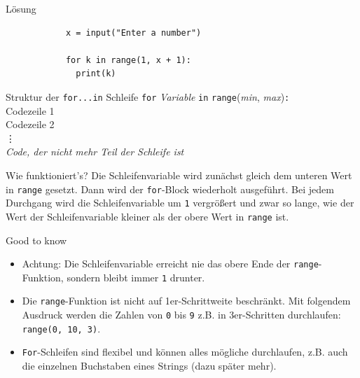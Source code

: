 \documentclass[algorithm,pgfplots,colortheme=dark]{cuzbeamer}
\newcommand{\py}[1]{\texttt{#1}}
\newcommand{\pybw}[1]{\texttt{#1}}
\newcommand{\spacechar}{\texttt{\char32\hspace{2pt}}}
\begin{document}
\begin{fragile}{}
	\begin{block}{Lösung}
		\begin{verbatim}
			x = input("Enter a number")
			
			for k in range(1, x + 1):	
			  print(k)
		\end{verbatim}
	\end{block}
\end{fragile}

\begin{frame}

	\renewcommand{\baselinestretch}{1.5}
	\begin{block}{Struktur der \texttt{for...in} Schleife}
		\vspace{2pt}
		\pause \py{for} \pause \textit{Variable} \pause \py{in} \pause \py{range}(\textit{min}, \textit{max})\pause\texttt{:} \pause \\
		\spacechar\spacechar Codezeile 1 \pause \\ 
\spacechar\spacechar Codezeile 2 \pause \\
\spacechar\spacechar \phantom{Code} \vdots \pause  \\
\textit{Code, der nicht mehr Teil der Schleife ist}
	\end{block}

\vspace{12pt}
\pause 

	\renewcommand{\baselinestretch}{1}
	\begin{block}{Wie funktioniert's?}
		\vspace{2pt}
	Die Schleifenvariable wird zunächst gleich dem unteren Wert in \py{range} gesetzt. Dann wird der \pybw{for}-Block wiederholt ausgeführt. Bei jedem Durchgang wird die Schleifenvariable um \pybw{1} vergrößert und zwar so lange, wie der Wert der Schleifenvariable kleiner als der obere Wert in \py{range} ist. 	
	\end{block}
\end{frame}

\begin{frame}
\begin{block}{Good to know}
	\pause
	\begin{itemize}[<+->]
		\item Achtung: Die Schleifenvariable erreicht nie das obere Ende der \py{range}-Funktion, sondern bleibt immer \pybw{1} drunter. 
		\item Die \py{range}-Funktion ist nicht auf 1er-Schrittweite beschränkt. Mit folgendem Ausdruck werden die Zahlen von \py{0} bis \py{9} z.B. in 3er-Schritten durchlaufen: \py{range(0, 10, 3)}. 
		\item \texttt{For}-Schleifen sind flexibel und können alles mögliche durchlaufen, z.B. auch die einzelnen Buchstaben eines Strings (dazu später mehr).
	\end{itemize}
\end{block}
\end{frame}
\end{document}
